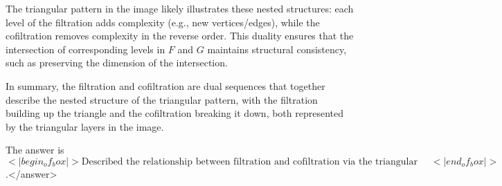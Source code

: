 The triangular pattern in the image likely illustrates these nested structures: each level of the filtration adds complexity (e.g., new vertices/edges), while the cofiltration removes complexity in the reverse order. This duality ensures that the intersection of corresponding levels in \( F \) and \( G \) maintains structural consistency, such as preserving the dimension of the intersection.  

In summary, the filtration and cofiltration are dual sequences that together describe the nested structure of the triangular pattern, with the filtration building up the triangle and the cofiltration breaking it down, both represented by the triangular layers in the image.  

The answer is \(<|begin_of_box|>\text{Described the relationship between filtration and cofiltration via the triangular pattern}<|end_of_box|>\).</answer>